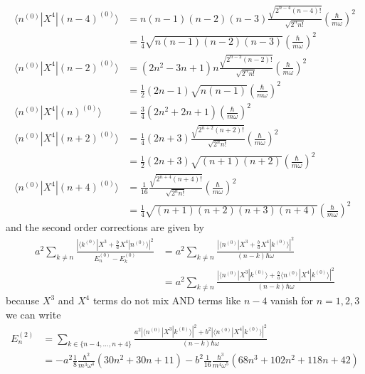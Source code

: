 \documentclass[../main.tex]{subfiles}
\begin{document}
\begin{align}
\langle n^{(0)}|X^4|(n-4)^{(0)}\rangle
&=n(n-1)(n-2)(n-3)\frac{\sqrt{2^{n-4}(n-4)!}}{\sqrt{2^n n!}}\left(\frac{\hbar}{m\omega}\right)^{2}\\
&=\frac{1}{4}\sqrt{n(n-1)(n-2)(n-3)}\left(\frac{\hbar}{m\omega}\right)^{2}\\
\langle n^{(0)}|X^4|(n-2)^{(0)}\rangle
&=(2n^2-3n+1)n\frac{\sqrt{2^{n-2}(n-2)!}}{\sqrt{2^n n!}}\left(\frac{\hbar}{m\omega}\right)^{2}\\
&=\frac{1}{2}(2n-1)\sqrt{n(n-1)}\left(\frac{\hbar}{m\omega}\right)^{2}\\
\langle n^{(0)}|X^4|(n)^{(0)}\rangle
&=\frac{3}{4}(2n^2+2n+1)\left(\frac{\hbar}{m\omega}\right)^{2}\\
\langle n^{(0)}|X^4|(n+2)^{(0)}\rangle
&=\frac{1}{4}(2n+3)\frac{\sqrt{2^{n+2}(n+2)!}}{\sqrt{2^n n!}}\left(\frac{\hbar}{m\omega}\right)^{2}\\
&=\frac{1}{2}(2n+3)\sqrt{(n+1)(n+2)}\left(\frac{\hbar}{m\omega}\right)^{2}\\
\langle n^{(0)}|X^4|(n+4)^{(0)}\rangle
&=\frac{1}{16}\frac{\sqrt{2^{n+4}(n+4)!}}{\sqrt{2^n n!}}\left(\frac{\hbar}{m\omega}\right)^{2}\\
&=\frac{1}{4}\sqrt{(n+1)(n+2)(n+3)(n+4)}\left(\frac{\hbar}{m\omega}\right)^{2}
\end{align}
and the second order corrections are given by
\begin{align}
a^2\sum_{k\neq n}\frac{|\langle k^{(0)}|X^3+\frac{b}{a}X^4|n^{(0)}\rangle|^2}{E_n^{(0)}-E_k^{(0)}}
&=a^2\sum_{k\neq n}\frac{|\langle n^{(0)}|X^3+\frac{b}{a}X^4|k^{(0)}\rangle|^2}{(n-k)\hbar\omega}\\
&=a^2\sum_{k\neq n}\frac{|\langle n^{(0)}|X^3|k^{(0)}\rangle+\frac{b}{a}\langle n^{(0)}|X^4|k^{(0)}\rangle|^2}{(n-k)\hbar\omega}
\end{align}
because $X^3$ and $X^4$ terms do not mix AND terms like $n-4$ vanish for $n=1,2,3$ we can write 
\begin{align}
E^{(2)}_n&=\sum_{k\in\{n-4,...,n+4\}}\frac{a^2|\langle n^{(0)}|X^3|k^{(0)}\rangle|^2+b^2|\langle n^{(0)}|X^4|k^{(0)}\rangle|^2}{(n-k)\hbar\omega}\\
&=-a^2\frac{1}{8}\frac{\hbar^2}{m^3\omega^4}(30n^2+30n+11)
-b^2\frac{1}{16}\frac{\hbar^3}{m^4\omega^5}(68n^3+102n^2+118n+42)
\end{align}
\end{document}
